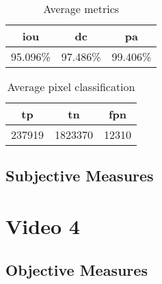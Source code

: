 \begin{minipage}[c]{0.475\textwidth}
\begin{table}[H]
    \centering
    \begin{tabular}{||c c c||} 
        \hline
        \acrshort{iou} & \acrshort{dc} & \acrshort{pa} \\ [0.5ex] 
        \hline\hline
        95.096\% & 97.486\% & 99.406\% \\ [1ex] 
        \hline
    \end{tabular}
    \caption{Average metrics}
    \label{tab:metrics_video_3}
\end{table}
\end{minipage}
\begin{minipage}[c]{0.475\textwidth}
\begin{table}[H]
    \centering
    \begin{tabular}{||c c c||} 
        \hline
        \acrshort{tp} & \acrshort{tn} & \acrshort{fpn} \\ [0.5ex] 
        \hline\hline
        237919 & 1823370 & 12310 \\ [1ex] 
        \hline
    \end{tabular}
    \caption{Average pixel classification}
    \label{tab:pixels_video_3}
\end{table}
\end{minipage}

\subsection{Subjective Measures}




\section{Video 4}
\subsection{Objective Measures}

